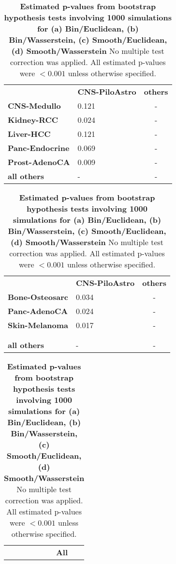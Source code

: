 \begin{table}[!htb]
    \caption{\textbf{Estimated p-values from bootstrap hypothesis tests involving 1000 simulations for (a) Bin/Euclidean, (b) Bin/Wasserstein, (c) Smooth/Euclidean, (d) Smooth/Wasserstein} No multiple test correction was applied. All estimated p-values were $<0.001$ unless otherwise specified.}
    \label{tab:gle_bootstrap}
    \begin{subtable}[!h]{.5\textwidth}
        \centering
        \begin{tabular}{ p{3cm}p{2.7cm}c }
        & \textbf{CNS-PiloAstro} & \textbf{others} \\
        \textbf{CNS-Medullo} & 0.121 & - \\
        \textbf{Kidney-RCC} & 0.024 & - \\
        \textbf{Liver-HCC} & 0.121 & - \\
        \textbf{Panc-Endocrine} & 0.069 & - \\
        \textbf{Prost-AdenoCA} & 0.009 & - \\
        \textbf{all others} & - & - \\
        \end{tabular}
        \vspace{0.2cm}
    \end{subtable} 
    \quad %
    \begin{subtable}[!h]{.5\textwidth}
        \centering
        \begin{tabular}{ p{2.9cm}p{2.7cm}c }
        & \textbf{CNS-PiloAstro} & \textbf{others} \\
        \textbf{Bone-Osteosarc} & 0.034 & - \\
        \textbf{Panc-AdenoCA} & 0.024 & - \\
        \textbf{Skin-Melanoma} & 0.017 & - \\
         &  &  \\
         &  &  \\
        \textbf{all others} & - & - \\
        \end{tabular}
        \vspace{0.2cm}
    \end{subtable}  
    \begin{subtable}[!h]{.5\textwidth}
        \centering
        \begin{tabular}{ p{3cm}p{2.7cm}c }
        &  & \textbf{All} \\

\end{tabular}
\end{subtable}
\end{table}
